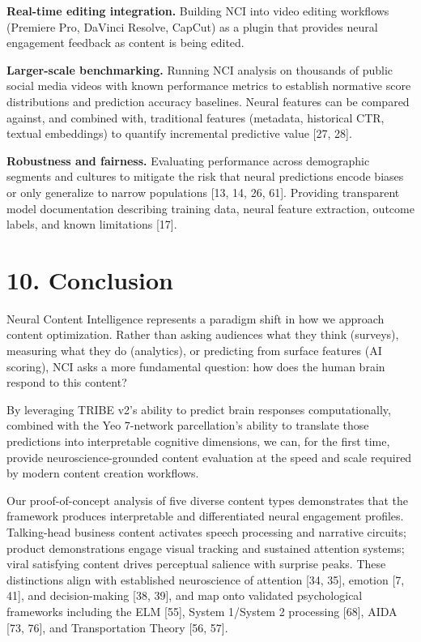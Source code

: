 \documentclass[11pt,letterpaper]{article}
\begin{document}
\textbf{Real-time editing integration.} Building NCI into video editing workflows (Premiere Pro, DaVinci Resolve, CapCut) as a plugin that provides neural engagement feedback as content is being edited.

\textbf{Larger-scale benchmarking.} Running NCI analysis on thousands of public social media videos with known performance metrics to establish normative score distributions and prediction accuracy baselines. Neural features can be compared against, and combined with, traditional features (metadata, historical CTR, textual embeddings) to quantify incremental predictive value [27, 28].

\textbf{Robustness and fairness.} Evaluating performance across demographic segments and cultures to mitigate the risk that neural predictions encode biases or only generalize to narrow populations [13, 14, 26, 61]. Providing transparent model documentation describing training data, neural feature extraction, outcome labels, and known limitations [17].


\section{10. Conclusion}

Neural Content Intelligence represents a paradigm shift in how we approach content optimization. Rather than asking audiences what they think (surveys), measuring what they do (analytics), or predicting from surface features (AI scoring), NCI asks a more fundamental question: how does the human brain respond to this content?

By leveraging TRIBE v2's ability to predict brain responses computationally, combined with the Yeo 7-network parcellation's ability to translate those predictions into interpretable cognitive dimensions, we can, for the first time, provide neuroscience-grounded content evaluation at the speed and scale required by modern content creation workflows.

Our proof-of-concept analysis of five diverse content types demonstrates that the framework produces interpretable and differentiated neural engagement profiles. Talking-head business content activates speech processing and narrative circuits; product demonstrations engage visual tracking and sustained attention systems; viral satisfying content drives perceptual salience with surprise peaks. These distinctions align with established neuroscience of attention [34, 35], emotion [7, 41], and decision-making [38, 39], and map onto validated psychological frameworks including the ELM [55], System 1/System 2 processing [68], AIDA [73, 76], and Transportation Theory [56, 57].
\end{document}
